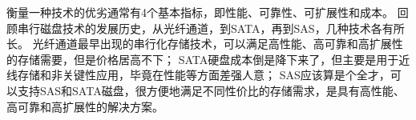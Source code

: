 衡量一种技术的优劣通常有4个基本指标，即性能、可靠性、可扩展性和成本。
回顾串行磁盘技术的发展历史，从光纤通道，到SATA，再到SAS，几种技术各有所长。
光纤通道最早出现的串行化存储技术，可以满足高性能、高可靠和高扩展性的存储需要，但是价格居高不下；
SATA硬盘成本倒是降下来了，但主要是用于近线存储和非关键性应用，毕竟在性能等方面差强人意；
SAS应该算是个全才，可以支持SAS和SATA磁盘，很方便地满足不同性价比的存储需求，是具有高性能、高可靠和高扩展性的解决方案。










